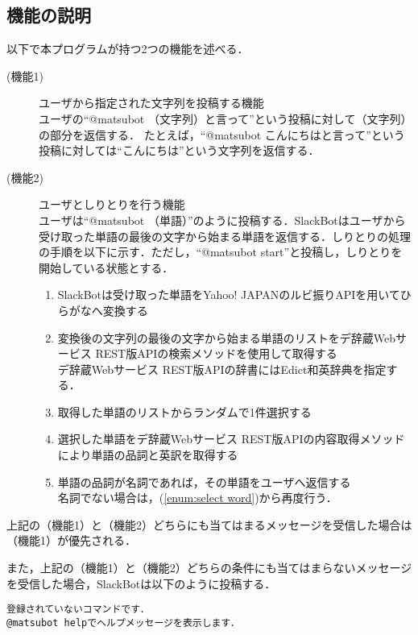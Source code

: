 \documentclass[12pt]{jsarticle}
\begin{document}
\subsection{機能の説明}
以下で本プログラムが持つ2つの機能を述べる．
\begin{description}
    \item[(機能1)] ユーザから指定された文字列を投稿する機能\\
        ユーザの``@matsubot （文字列）と言って''という投稿に対して（文字列）の部分を返信する．
        たとえば，``@matsubot こんにちはと言って''という投稿に対しては``こんにちは''という文字列を返信する．
    \item[(機能2)] ユーザとしりとりを行う機能\\
        ユーザは``@matsubot （単語）''のように投稿する．SlackBotはユーザから受け取った単語の最後の文字から始まる単語を返信する．しりとりの処理の手順を以下に示す．ただし，``@matsubot start''と投稿し，しりとりを開始している状態とする．
        \begin{enumerate}
        \item SlackBotは受け取った単語をYahoo! JAPANのルビ振りAPI\cite{yahoo_api}を用いてひらがなへ変換する
        \item 変換後の文字列の最後の文字から始まる単語のリストをデ辞蔵Webサービス REST版API\cite{dict_api}の検索メソッドを使用して取得する\\
        デ辞蔵Webサービス REST版APIの辞書にはEdict和英辞典を指定する．
        \item 取得した単語のリストからランダムで1件選択する\label{enum:select word}
        \item 選択した単語をデ辞蔵Webサービス REST版APIの内容取得メソッドにより単語の品詞と英訳を取得する
        \item 単語の品詞が名詞であれば，その単語をユーザへ返信する\\
        名詞でない場合は，(\ref{enum:select word})から再度行う．
        \end{enumerate}
\end{description}
上記の（機能1）と（機能2）どちらにも当てはまるメッセージを受信した場合は（機能1）が優先される．

また，上記の（機能1）と（機能2）どちらの条件にも当てはまらないメッセージを受信した場合，SlackBotは以下のように投稿する．

\begin{verbatim}
登録されていないコマンドです．
@matsubot helpでヘルプメッセージを表示します．
\end{verbatim}
\end{document}
